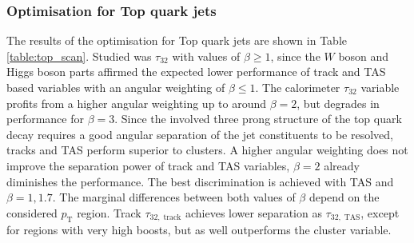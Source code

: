 \subsubsection{Optimisation for Top quark jets}
The results of the optimisation for Top quark jets are shown in Table \ref{table:top_scan}. Studied was $\tau_{32}$ with values of $\beta \ge 1$,  since the $W$ boson and Higgs boson parts affirmed the expected lower performance of track and TAS based variables with an angular weighting of $\beta \le 1$. The calorimeter $\tau_{32}$ variable profits from a higher angular weighting up to around $\beta=2$, but degrades in performance for $\beta=3$. Since the involved three prong structure of the top quark decay requires a good angular separation of the jet constituents to be resolved, tracks and TAS perform superior to clusters. A higher angular weighting does not improve the separation power of track and TAS variables, $\beta=2$ already diminishes the performance. The best discrimination is achieved with TAS and $\beta=1,1.7$. The marginal differences between both values of $\beta$ depend on the considered $p_{\mathrm{T}}$ region. Track $\tau_{32,\;\text{track}}$ achieves lower separation as $\tau_{32,\;\text{TAS}}$, except for regions with very high boosts, but as well outperforms the cluster variable.

